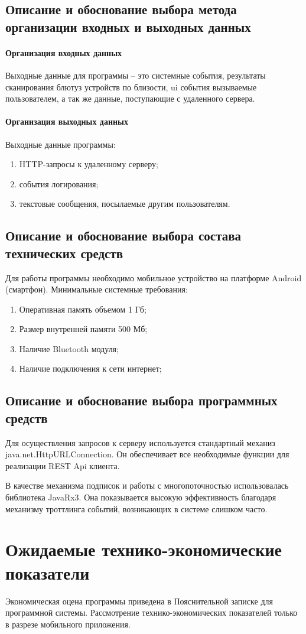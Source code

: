 \documentclass[explnote]{espd}
\begin{document}
\subsection{Описание и обоснование выбора метода организации входных и выходных данных}
\paragraph{Организация входных данных}
Выходные данные для программы -- это системные события, результаты сканирования блютуз устройств по близости, ui события вызываемые пользователем, а так же данные, поступающие с удаленного сервера.

\paragraph{Организация выходных данных}\label{paragraph:output}
Выходные данные программы:

\begin{enumerate}
\item HTTP-запросы к удаленному серверу;
\item события логирования;
\item текстовые сообщения, посылаемые другим пользователям.
\end{enumerate}

\subsection{Описание и обоснование выбора состава технических средств}
Для работы программы необходимо мобильное устройство на платформе Android (смартфон). Минимальные системные требования:

\begin{enumerate}
\item Оперативная память объемом 1 Гб;
\item Размер внутренней памяти 500 Мб;
\item Наличие Bluetooth модуля;
\item Наличие подключения к сети интернет;
\end{enumerate}

\subsection{Описание и обоснование выбора программных средств}
Для осуществления запросов к серверу используется стандартный механиз java.net.HttpURLConnection. Он обеспечивает все необходимые функции для реализации REST Api клиента.

В качестве механизма подписок и работы с многопоточностью использовалась библиотека JavaRx3. Она показывается высокую эффективность благодаря механизму троттлинга событий, возникающих в системе слишком часто. 

\section{Ожидаемые технико-экономические показатели}
Экономическая оцена программы приведена в Пояснительной записке для программной системы. Рассмотрение технико-экономических показателей только в разрезе мобильного приложения.


\end{document}
